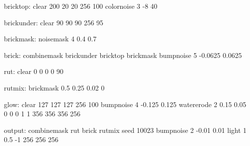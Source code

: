bricktop:
	clear 200 20 20 256 100
	colornoise 3 -8 40

brickunder:
	clear 90 90 90 256 95

brickmask:
	noisemask 4 0.4 0.7

brick:
	combinemask brickunder bricktop brickmask
	bumpnoise 5 -0.0625 0.0625

rut:
	clear 0 0 0 0 90

rutmix:
	brickmask 0.5 0.25 0.02 0

glow:
	clear 127 127 127 256 100
	bumpnoise 4 -0.125 0.125
	watererode 2 0.15 0.05 0 0 0 1 1 356 356 356 256

output:
	combinemask rut brick rutmix
	seed 10023
	bumpnoise 2 -0.01 0.01
	light 1 0.5 -1 256 256 256